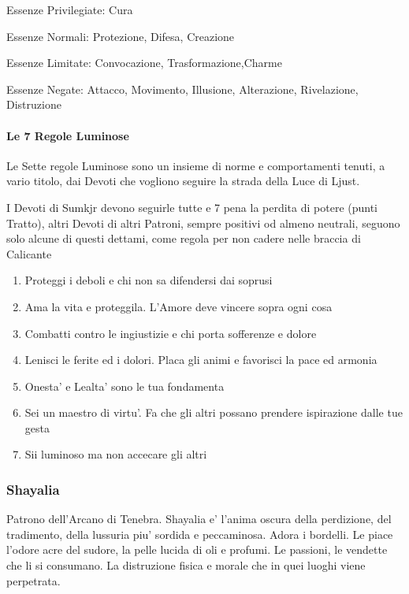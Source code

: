 \documentclass[a4paper,11pt,twoside,openany]{book}
\begin{document}
{		\bigskip
		
		Essenze Privilegiate: Cura
		
		Essenze Normali: Protezione, Difesa, Creazione
		
		Essenze Limitate: Convocazione, Trasformazione,Charme
		
		Essenze Negate: Attacco, Movimento, Illusione, Alterazione, Rivelazione, Distruzione
		
		\bigskip
		
		\paragraph{Le 7 Regole Luminose}
		
		\label{le-7-regole-luminose}
		
		Le Sette regole Luminose sono un insieme di norme e comportamenti tenuti, a vario titolo, dai Devoti che vogliono seguire la strada della Luce di Ljust.
		
		I Devoti di Sumkjr devono seguirle tutte e 7 pena la perdita di potere (punti Tratto), altri Devoti di altri Patroni, sempre positivi od almeno neutrali, seguono solo alcune di questi dettami, come regola per non cadere nelle braccia di Calicante
		
		
		\begin{enumerate}
			\item Proteggi i deboli e chi non sa difendersi dai soprusi
			\item Ama la vita e proteggila. L'Amore deve vincere sopra ogni cosa
			\item Combatti contro le ingiustizie e chi porta sofferenze e dolore
			\item Lenisci le ferite ed i dolori. Placa gli animi e favorisci la pace
			ed armonia
			\item Onesta' e Lealta' sono le tua fondamenta
			\item Sei un maestro di virtu'. Fa che gli altri possano prendere ispirazione
			dalle tue gesta
			\item Sii luminoso ma non accecare gli altri
		\end{enumerate}
		
		\subsubsection{Shayalia}
		
		\label{shayalia}
		
		Patrono dell'Arcano di Tenebra. Shayalia e' l'anima oscura della perdizione, del tradimento, della lussuria piu' sordida e peccaminosa. Adora i bordelli. Le piace l'odore acre del sudore, la pelle lucida di oli e profumi. Le passioni, le vendette che li si consumano. La distruzione fisica e morale che in quei luoghi viene perpetrata.
		
}
\end{document}
